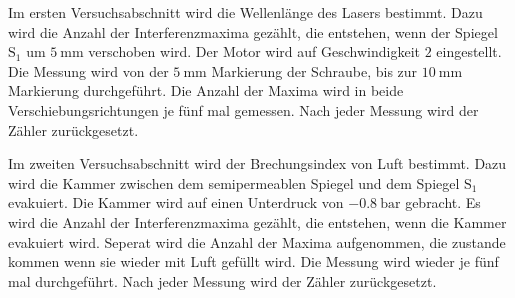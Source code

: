 Im ersten Versuchsabschnitt wird die Wellenlänge des Lasers bestimmt. Dazu wird die Anzahl der Interferenzmaxima gezählt, die
entstehen, wenn der Spiegel $\text{S}_1$ um $\SI{5}{\milli\meter}$ verschoben wird. Der Motor wird auf Geschwindigkeit $2$ eingestellt.
Die Messung wird von der $\SI{5}{\milli\meter}$ Markierung der Schraube, bis zur $\SI{10}{\milli\meter}$ Markierung durchgeführt.
Die Anzahl der Maxima wird in beide Verschiebungsrichtungen je fünf mal gemessen. Nach jeder Messung wird der Zähler zurückgesetzt.

Im zweiten Versuchsabschnitt wird der Brechungsindex von Luft bestimmt. 
Dazu wird die Kammer zwischen dem semipermeablen Spiegel und dem Spiegel $\text{S}_1$ evakuiert.
Die Kammer wird auf einen Unterdruck von $\SI{-0.8}{\bar}$ gebracht.
Es wird die Anzahl der Interferenzmaxima gezählt, die entstehen, wenn die Kammer evakuiert wird. 
Seperat wird die Anzahl der Maxima aufgenommen, die zustande kommen wenn sie wieder mit Luft gefüllt wird.
Die Messung wird wieder je fünf mal durchgeführt. Nach jeder Messung wird der Zähler zurückgesetzt.